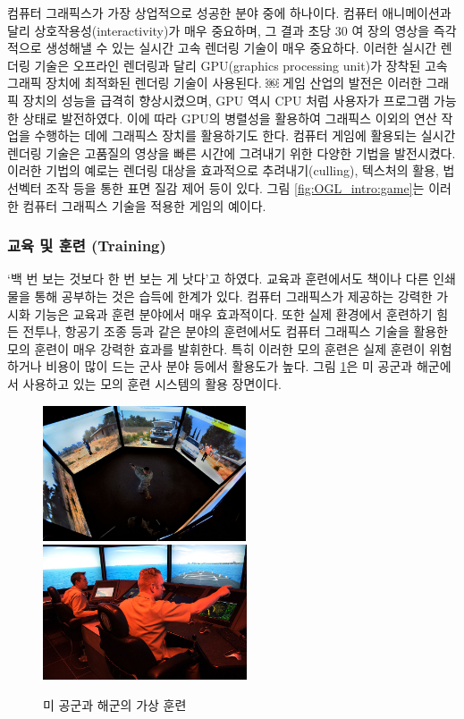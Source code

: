 컴퓨터 그래픽스가 가장 상업적으로 성공한 분야 중에 하나이다. 컴퓨터 애니메이션과 달리 상호작용성(interactivity)가 매우 중요하며, 그 결과 초당 30 여 장의 영상을 즉각적으로 생성해낼 수 있는 실시간 고속 렌더링 기술이 매우 중요하다. 이러한 실시간 렌더링 기술은 오프라인 렌더링과 달리 GPU(graphics processing unit)가 장착된 고속 그래픽 장치에 최적화된 렌더링 기술이 사용된다. 
￼
게임 산업의 발전은 이러한 그래픽 장치의 성능을 급격히 향상시켰으며, GPU 역시 CPU 처럼 사용자가 프로그램 가능한 상태로 발전하였다. 이에 따라 GPU의 병렬성을 활용하여 그래픽스 이외의 연산 작업을 수행하는 데에 그래픽스 장치를 활용하기도 한다. 컴퓨터 게임에 활용되는 실시간 렌더링 기술은 고품질의 영상을 빠른 시간에 그려내기 위한 다양한 기법을 발전시켰다. 이러한 기법의 예로는 렌더링 대상을 효과적으로 추려내기(culling), 텍스처의 활용, 법선벡터 조작 등을 통한 표면 질감 제어 등이 있다. 그림 \ref{fig:OGL_intro:game}는 이러한 컴퓨터 그래픽스 기술을 적용한 게임의 예이다.



\subsubsection{교육 및 훈련 (Training)}

‘백 번 보는 것보다 한 번 보는 게 낫다’고 하였다. 교육과 훈련에서도 책이나 다른  인쇄물을 통해 공부하는 것은 습득에 한계가 있다. 컴퓨터 그래픽스가 제공하는 강력한 가시화 기능은 교육과 훈련 분야에서 매우 효과적이다. 또한 실제 환경에서 훈련하기 힘든 전투나, 항공기 조종 등과 같은 분야의 훈련에서도 컴퓨터 그래픽스 기술을 활용한 모의 훈련이 매우 강력한 효과를 발휘한다. 특히 이러한 모의 훈련은 실제 훈련이 위험하거나 비용이 많이 드는 군사 분야 등에서 활용도가 높다. 그림 \ref{fig:OGL_intro:virtualTraining}은 미 공군과 해군에서 사용하고 있는 모의 훈련 시스템의 활용 장면이다.

\begin{figure}[h!]
  \centering
    \includegraphics[height=4cm]{OGL_intro/virtualTraining.jpg}
    \includegraphics[height=4cm]{OGL_intro/virtualTraining2.jpg}
    \caption{미 공군과 해군의 가상 훈련}
    \label{fig:OGL_intro:virtualTraining}
\end{figure}

